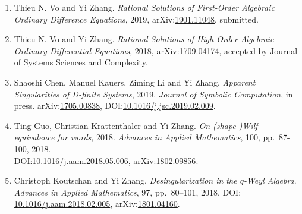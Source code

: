 \documentclass[a4paper,12pt]{article}
\begin{document}
\begin{enumerate}
 \item Thieu N. Vo and Yi Zhang. 
{\em Rational Solutions of First-Order Algebraic Ordinary Difference Equations}, 2019, 
arXiv:\href{http://arxiv.org/abs/1901.11048}{1901.11048}, submitted.
 \item Thieu N. Vo and Yi Zhang. {\em Rational Solutions of High-Order Algebraic Ordinary Differential Equations}, 2018, 
 arXiv:\href{https://arxiv.org/abs/1709.04174}{1709.04174}, accepted by Journal of Systems Sciences and Complexity.
  \item Shaoshi Chen, Manuel Kauers, Ziming Li and Yi Zhang. {\em Apparent Singularities of D-finite Systems}, 2019. 
 {\em  Journal of Symbolic Computation}, in press. arXiv:\href{http://arxiv.org/abs/1705.00838}{1705.00838},  
 DOI:\href{https://doi.org/10.1016/j.jsc.2019.02.009}{10.1016/j.jsc.2019.02.009}.
\item Ting Guo, Christian Krattenthaler and Yi Zhang.
{\em On (shape-)Wilf-equivalence for words}, 2018.
{\em  Advances in Applied Mathematics}, 100, pp.\ 87-100, 2018. \\
DOI:\href{https://doi.org/10.1016/j.aam.2018.05.006}{10.1016/j.aam.2018.05.006}, 
arXiv:\href{https://arxiv.org/pdf/1802.09856.pdf}{1802.09856}.
\item Christoph Koutschan and Yi Zhang. {\em Desingularization in the $q$-Weyl Algebra}. 
{\em Advances in Applied Mathematics}, 97, pp.\ 80–101, 2018. 
DOI: \href{http://dx.doi.org/10.1016/j.aam.2018.02.005}{10.1016/j.aam.2018.02.005},
arXiv:\href{https://arxiv.org/abs/1801.04160}{1801.04160}.   

\end{enumerate}
\end{document}
